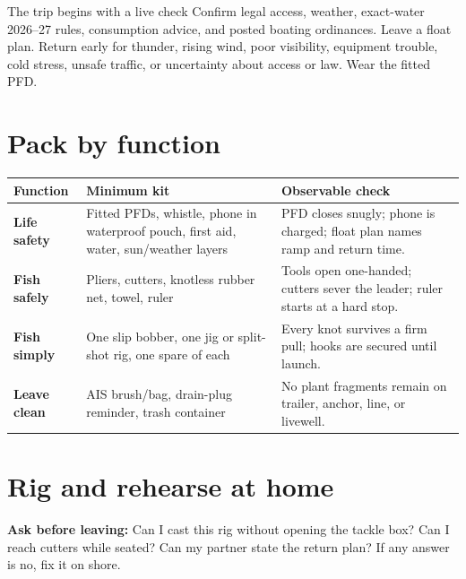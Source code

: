 
\begin{teloshazard}{The trip begins with a live check}
Confirm legal access, weather, exact-water 2026--27 rules, consumption advice,
and posted boating ordinances. Leave a float plan. Return early for thunder,
rising wind, poor visibility, equipment trouble, cold stress, unsafe traffic,
or uncertainty about access or law. Wear the fitted PFD.
\end{teloshazard}

\section{Pack by function}
\begin{tabularx}{\linewidth}{@{}>{\bfseries}p{.18\linewidth}X>{\raggedright\arraybackslash}p{.25\linewidth}@{}}
\toprule Function&Minimum kit&Observable check\\\midrule
Life safety&Fitted PFDs, whistle, phone in waterproof pouch, first aid, water,
sun/weather layers&PFD closes snugly; phone is charged; float plan names ramp
and return time.\\
Fish safely&Pliers, cutters, knotless rubber net, towel, ruler&Tools open
one-handed; cutters sever the leader; ruler starts at a hard stop.\\
Fish simply&One slip bobber, one jig or split-shot rig, one spare of each&Every
knot survives a firm pull; hooks are secured until launch.\\
Leave clean&AIS brush/bag, drain-plug reminder, trash container&No plant
fragments remain on trailer, anchor, line, or livewell.\\
\bottomrule
\end{tabularx}

\section{Rig and rehearse at home}
\begin{center}
\end{center}
\textbf{Ask before leaving:} Can I cast this rig without opening the tackle
box? Can I reach cutters while seated? Can my partner state the return plan?
If any answer is no, fix it on shore.

